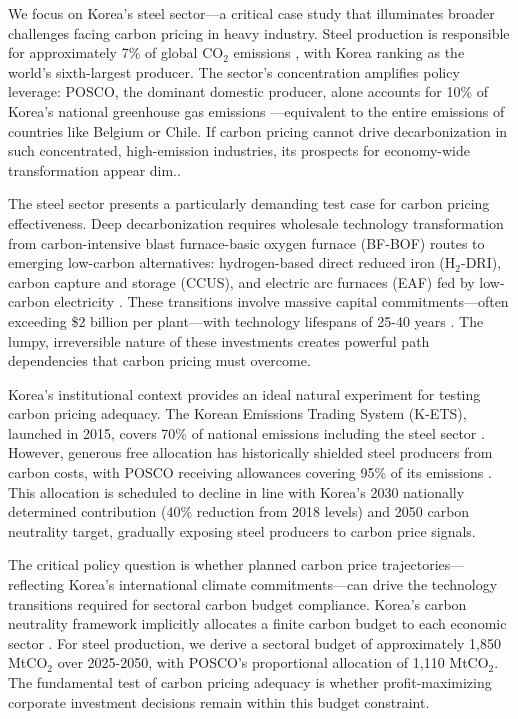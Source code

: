 \documentclass[preprint,1p,authoryear]{elsarticle}
\begin{document}
We focus on Korea's steel sector—a critical case study that illuminates broader challenges facing carbon pricing in heavy industry. Steel production is responsible for approximately 7\% of global CO$_2$ emissions \citep{worldsteel2022}, with Korea ranking as the world's sixth-largest producer. The sector's concentration amplifies policy leverage: POSCO, the dominant domestic producer, alone accounts for 10\% of Korea's national greenhouse gas emissions \citep{kosis2023}—equivalent to the entire emissions of countries like Belgium or Chile. If carbon pricing cannot drive decarbonization in such concentrated, high-emission industries, its prospects for economy-wide transformation appear dim.. 

The steel sector presents a particularly demanding test case for carbon pricing effectiveness. Deep decarbonization requires wholesale technology transformation from carbon-intensive blast furnace-basic oxygen furnace (BF-BOF) routes to emerging low-carbon alternatives: hydrogen-based direct reduced iron (H$_2$-DRI), carbon capture and storage (CCUS), and electric arc furnaces (EAF) fed by low-carbon electricity \citep{IEA2020steel}. These transitions involve massive capital commitments—often exceeding \$2 billion per plant—with technology lifespans of 25-40 years \citep{materialeconomics2019}. The lumpy, irreversible nature of these investments creates powerful path dependencies that carbon pricing must overcome.

Korea's institutional context provides an ideal natural experiment for testing carbon pricing adequacy. The Korean Emissions Trading System (K-ETS), launched in 2015, covers 70\% of national emissions including the steel sector \citep{kim2021kets}. However, generous free allocation has historically shielded steel producers from carbon costs, with POSCO receiving allowances covering 95\% of its emissions \citep{icap2024korea}. This allocation is scheduled to decline in line with Korea's 2030 nationally determined contribution (40\% reduction from 2018 levels) and 2050 carbon neutrality target, gradually exposing steel producers to carbon price signals.

The critical policy question is whether planned carbon price trajectories—reflecting Korea's international climate commitments—can drive the technology transitions required for sectoral carbon budget compliance. Korea's carbon neutrality framework implicitly allocates a finite carbon budget to each economic sector \citep{korea2020carbon}. For steel production, we derive a sectoral budget of approximately 1,850 MtCO$_2$ over 2025-2050, with POSCO's proportional allocation of 1,110 MtCO$_2$. The fundamental test of carbon pricing adequacy is whether profit-maximizing corporate investment decisions remain within this budget constraint.
\end{document}
